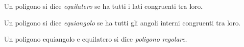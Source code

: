 \begin{definizione}
Un poligono si dice \emph{equilatero} se ha tutti i lati congruenti tra loro.
\end{definizione}

\begin{definizione}
Un poligono si dice \emph{equiangolo} se ha tutti gli angoli interni congruenti tra loro.
\end{definizione}

\begin{definizione}
Un poligono equiangolo e equilatero si dice \emph{poligono regolare}.
\end{definizione}

\ovalbox{\risolvii \ref{ese:1.125}, \ref{ese:1.126}, \ref{ese:1.127}, \ref{ese:1.128}, \ref{ese:1.129}, \ref{ese:1.130}, \ref{ese:1.131}, \ref{ese:1.132}, \ref{ese:1.133}, \ref{ese:1.134}}



